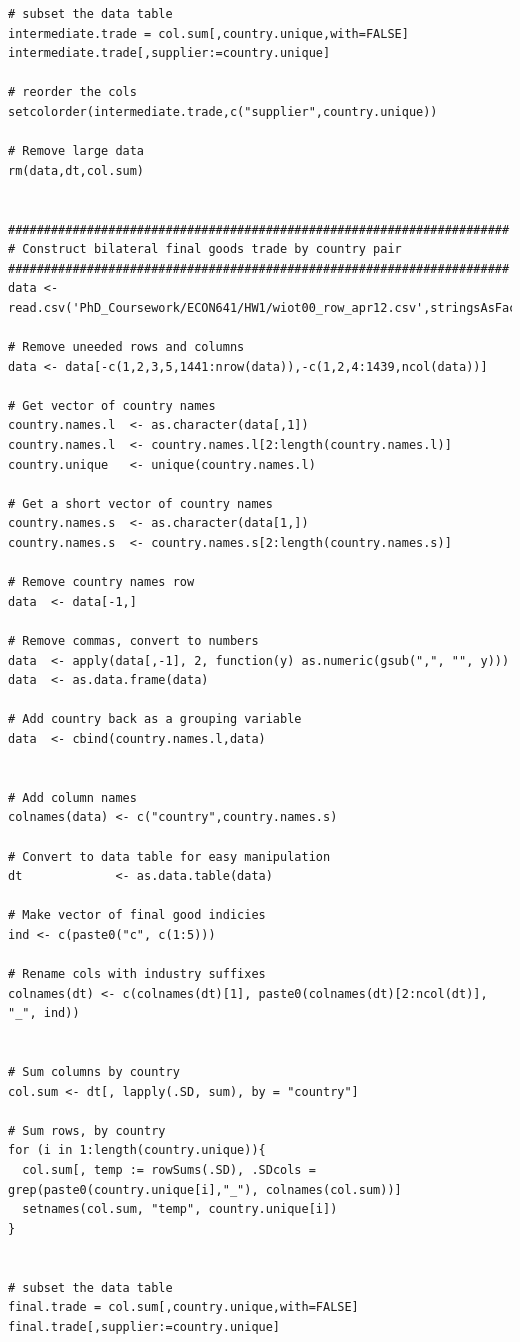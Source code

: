 \documentclass[12pt]{article}
\begin{document}
\begin{verbatim}
# subset the data table
intermediate.trade = col.sum[,country.unique,with=FALSE]
intermediate.trade[,supplier:=country.unique]

# reorder the cols
setcolorder(intermediate.trade,c("supplier",country.unique))

# Remove large data
rm(data,dt,col.sum)


######################################################################
# Construct bilateral final goods trade by country pair
######################################################################
data <- read.csv('PhD_Coursework/ECON641/HW1/wiot00_row_apr12.csv',stringsAsFactors=FALSE)

# Remove uneeded rows and columns
data <- data[-c(1,2,3,5,1441:nrow(data)),-c(1,2,4:1439,ncol(data))]

# Get vector of country names
country.names.l  <- as.character(data[,1])
country.names.l  <- country.names.l[2:length(country.names.l)]
country.unique   <- unique(country.names.l)

# Get a short vector of country names
country.names.s  <- as.character(data[1,])
country.names.s  <- country.names.s[2:length(country.names.s)]

# Remove country names row
data  <- data[-1,]

# Remove commas, convert to numbers
data  <- apply(data[,-1], 2, function(y) as.numeric(gsub(",", "", y)))
data  <- as.data.frame(data)

# Add country back as a grouping variable
data  <- cbind(country.names.l,data)


# Add column names
colnames(data) <- c("country",country.names.s)

# Convert to data table for easy manipulation
dt             <- as.data.table(data)

# Make vector of final good indicies
ind <- c(paste0("c", c(1:5)))

# Rename cols with industry suffixes 
colnames(dt) <- c(colnames(dt)[1], paste0(colnames(dt)[2:ncol(dt)], "_", ind))


# Sum columns by country
col.sum <- dt[, lapply(.SD, sum), by = "country"]

# Sum rows, by country
for (i in 1:length(country.unique)){
  col.sum[, temp := rowSums(.SD), .SDcols = grep(paste0(country.unique[i],"_"), colnames(col.sum))]
  setnames(col.sum, "temp", country.unique[i])
}


# subset the data table
final.trade = col.sum[,country.unique,with=FALSE]
final.trade[,supplier:=country.unique]


\end{verbatim}
\end{document}
